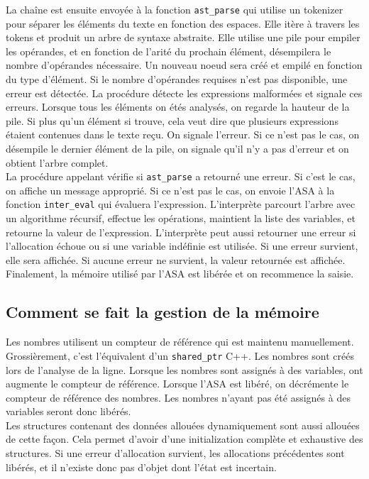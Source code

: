 \documentclass[a4paper,12pt,french]{article}
\begin{document}
		La chaîne est ensuite envoyée à la fonction \lstinline$ast_parse$ qui utilise un tokenizer pour séparer
		les éléments du texte en fonction des espaces. Elle itère à travers les tokens et produit un
		arbre de syntaxe abstraite. Elle utilise une pile pour empiler les opérandes, et en fonction
		de l'arité du prochain élément, désempilera le nombre d'opérandes nécessaire. Un nouveau
		noeud sera créé et empilé en fonction du type d'élément. Si le nombre d'opérandes requises
		n'est pas disponible, une erreur est détectée. La procédure détecte les expressions malformées
		et signale ces erreurs. Lorsque tous les éléments on étés analysés, on regarde la hauteur de
		la pile. Si plus qu'un élément si trouve, cela veut dire que plusieurs expressions étaient
		contenues dans le texte reçu. On signale l'erreur. Si ce n'est pas le cas, on désempile le dernier
		élément de la pile, on signale qu'il n'y a pas d'erreur et on obtient l'arbre complet.\\

		La procédure appelant vérifie si \lstinline$ast_parse$ a retourné une erreur. Si c'est le cas, on affiche
		un message approprié. Si ce n'est pas le cas, on envoie l'ASA à la fonction \lstinline$inter_eval$ qui évaluera
		l'expression. L'interprète parcourt l'arbre avec un algorithme récursif, effectue les opérations,
		maintient la liste des variables, et retourne la valeur de l'expression. L'interprète peut aussi
		retourner une erreur si l'allocation échoue ou si une variable indéfinie est utilisée. Si une erreur
		survient, elle sera affichée. Si aucune erreur ne survient, la valeur retournée est affichée.
		Finalement, la mémoire utilisé par l'ASA est libérée et on recommence la saisie.\\

	\subsection{Comment se fait la gestion de la mémoire}
		Les nombres utilisent un compteur de référence qui est maintenu manuellement. Grossièrement,
		c'est l'équivalent d'un \lstinline$shared_ptr$ C++. Les nombres sont créés lors de l'analyse de la
		ligne. Lorsque les nombres sont assignés à des variables, ont augmente le compteur de
		référence. Lorsque l'ASA est libéré, on décrémente le compteur de référence des nombres.
		Les nombres n'ayant pas été assignés à des variables seront donc libérés.\\

		Les structures contenant des données allouées dynamiquement sont aussi allouées de cette
		façon. Cela permet d'avoir d'une initialization complète et exhaustive des structures.
		Si une erreur d'allocation survient, les allocations précédentes sont libérés, et il
		n'existe donc pas d'objet dont l'état est incertain.\\
\end{document}

